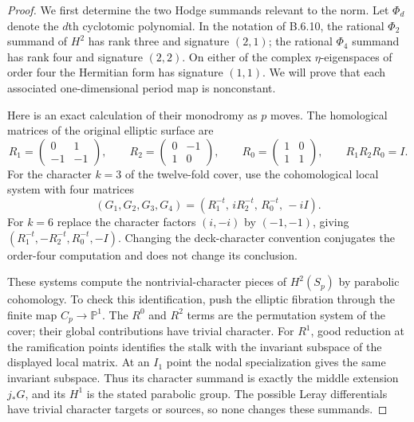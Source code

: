 \begin{proof}
We first determine the two Hodge summands relevant to the norm.
Let $\Phi_d$ denote the $d$th cyclotomic polynomial. In the
notation of B.6.10, the rational $\Phi_2$ summand of $H^2$ has
rank three and signature $(2,1)$; the rational $\Phi_4$ summand
has rank four and signature $(2,2)$. On either of the complex
$\eta$-eigenspaces of order four the Hermitian form has
signature $(1,1)$. We will prove that each associated
one-dimensional period map is nonconstant.

Here is an exact calculation of their monodromy as $p$ moves.
The homological matrices of the original elliptic surface are
\[
 R_1=\begin{pmatrix}0&1\\-1&-1\end{pmatrix},\qquad
 R_2=\begin{pmatrix}0&-1\\1&0\end{pmatrix},\qquad
 R_0=\begin{pmatrix}1&0\\1&1\end{pmatrix},\qquad
 R_1R_2R_0=I.
\]
For the character $k=3$ of the twelve-fold cover, use the
cohomological local system with four matrices
\[
 (G_1,G_2,G_3,G_4)
       =(R_1^{-t},\,iR_2^{-t},\,R_0^{-t},\,-iI).
 \tag{B.6.20}
\]
For $k=6$ replace the character factors $(i,-i)$ by $(-1,-1)$,
giving
$(R_1^{-t},-R_2^{-t},R_0^{-t},-I)$.
Changing the deck-character convention conjugates the
order-four computation and does not change its conclusion.

These systems compute the nontrivial-character pieces of
$H^2(S_p)$ by parabolic cohomology. To check this identification,
push the elliptic fibration through the finite map $C_p\to\mathbb
P^1$. The $R^0$ and $R^2$ terms are the permutation system of
the cover; their global contributions have trivial character.
For $R^1$, good reduction at the ramification points identifies
the stalk with the invariant subspace of the displayed local
matrix. At an $I_1$ point the nodal specialization gives the
same invariant subspace. Thus its character summand is exactly
the middle extension $j_*G$, and its $H^1$ is the stated
parabolic group. The possible Leray differentials have trivial
character targets or sources, so none changes these summands.


\end{proof}
